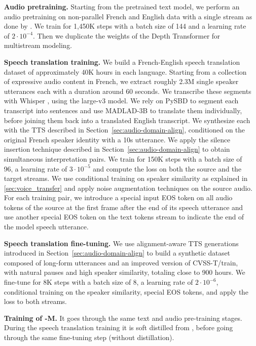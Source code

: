 \textbf{Audio pretraining.}
Starting from the pretrained text model, we perform an audio pretraining on non-parallel French and English data with a single stream as done by \citet{moshi}. We train for 1,450K steps with a batch size of 144 and a learning rate of $2\cdot10^{-4}$. Then we duplicate the weights of the Depth Transformer for multistream modeling.

\textbf{Speech translation training.}
We build a French-English speech translation dataset of approximately 40K hours in each language. Starting from a collection of expressive audio content in French, we extract roughly 2.3M single speaker utterances each with a duration around 60 seconds. We transcribe these segments with Whisper \citep{whisper}, using the large-v3 model. We rely on PySBD \citep{pysbd} to segment each transcript into sentences and use MADLAD-3B \citep{madlad} to translate them individually, before joining them back into a translated English transcript. We synthesize each with the TTS
described in Section~\ref{sec:audio-domain-align}, conditioned on the original French speaker identity with a 10s utterance. 
We apply the silence insertion technique described in Section~\ref{sec:audio-domain-align} to obtain simultaneous interpretation pairs. We train for 150K steps with a batch size of 96, a learning rate of $3\cdot10^{-5}$ and compute the loss on both the source and the target streams. We use conditional training on speaker similarity as explained in \ref{sec:voice_transfer} and apply noise augmentation techniques on the source audio. For each training pair, we introduce a special input EOS token on all audio tokens of the source at the first frame after the end of its speech utterance and use another special EOS token on the text tokens stream to indicate the end of the model speech utterance. 

\textbf{Speech translation fine-tuning.}
We use alignment-aware TTS generations introduced in Section~\ref{sec:audio-domain-align} to build a synthetic dataset composed of long-form utterances and an improved version of CVSS-T/train, with natural pauses and high speaker similarity, totaling close to 900 hours. 
We fine-tune for 8K steps with a batch size of 8, a learning rate of $2\cdot10^{-6}$, conditional training on the speaker similarity, special EOS tokens, and apply the loss to both streams.

\textbf{Training of \ours-M.}
It goes through the same text and audio pre-training stages. During 
the speech translation training it is soft distilled from \ours, before
going through the same fine-tuning step (without distillation).

